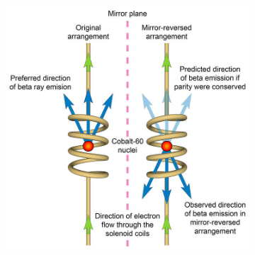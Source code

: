 	\begin{figure}[H]
		\begin{subfigure}{0.6\linewidth}
			\centering
			\includegraphics[width=0.6\plotwidth]{fig/chapt2/Wu_experiment.jpg}
			\caption{\label{fig:parity-violation:A}}
		\end{subfigure}
		\begin{subfigure}{0.4\linewidth}
			\centering

\end{subfigure}
\end{figure}
